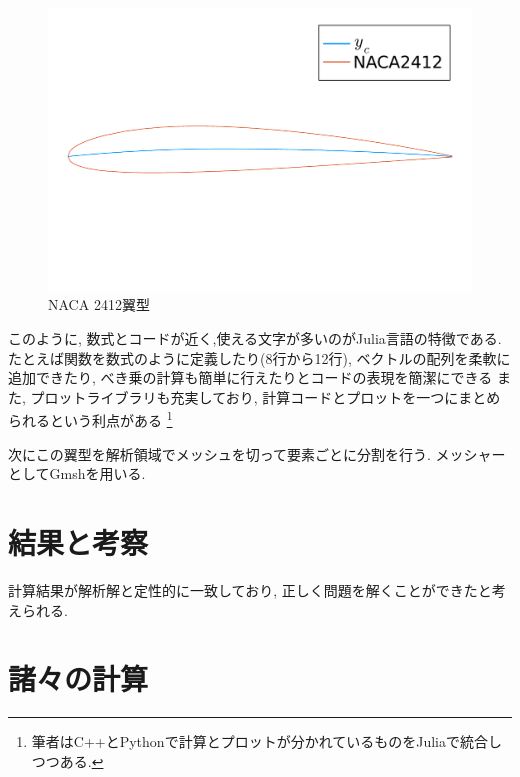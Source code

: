 \documentclass{ltjsarticle}
\begin{document}
\inputminted[linenos, breaklines]{julia}{plot_NACA2412.jl}
\begin{figure}[htbp]
    \centering
    \includegraphics[width=12cm]{NACA2412.pdf}
    \caption{NACA 2412翼型}
    \label{fig:NACA2412}
\end{figure}
このように, 数式とコードが近く,使える文字が多いのがJulia言語の特徴である.
たとえば関数を数式のように定義したり(8行から12行), ベクトルの配列を柔軟に追加できたり, 
べき乗の計算も簡単に行えたりとコードの表現を簡潔にできる
また, プロットライブラリも充実しており, 計算コードとプロットを一つにまとめられるという利点がある
\footnote{筆者はC++とPythonで計算とプロットが分かれているものをJuliaで統合しつつある.}

次にこの翼型を解析領域でメッシュを切って要素ごとに分割を行う.
メッシャーとしてGmsh\cite{Geuzaine2009}を用いる.

\section{結果と考察}
計算結果が解析解と定性的に一致しており, 正しく問題を解くことができたと考えられる.

\clearpage
\printbibliography[title=参考文献]

\appendix
\section{諸々の計算}
\end{document}
